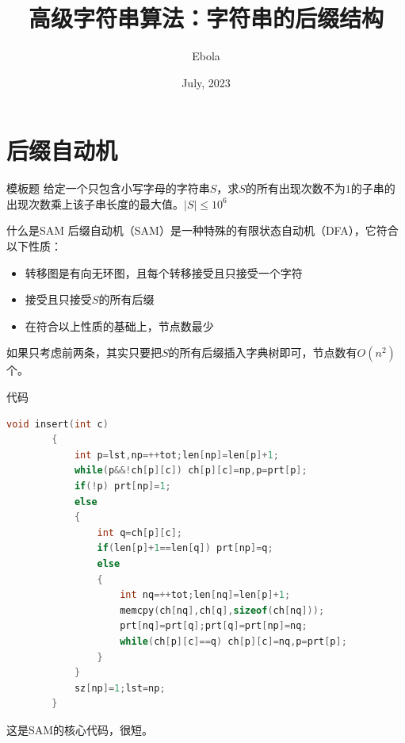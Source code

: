 \documentclass{beamer}
\author{Ebola}
\title{高级字符串算法：字符串的后缀结构}
\institute{
    Institute of Mathematics, \\
    Zhejiang University.
}
\date{July, 2023}
\begin{document}
\begin{frame}
    \titlepage
\end{frame}

\begin{frame}
    \tableofcontents[sectionstyle=show,subsectionstyle=show/shaded/hide,subsubsectionstyle=show/shaded/hide]
\end{frame}

\section{后缀自动机}

\begin{frame}{模板题}
    \small
    给定一个只包含小写字母的字符串$S$，求$S$的所有出现次数不为$1$的子串的出现次数乘上该子串长度的最大值。$|S|\leq 10^6$
\end{frame}

\begin{frame}{什么是SAM}
    \small
    后缀自动机（SAM）是一种特殊的有限状态自动机（DFA），它符合以下性质：

    \begin{itemize}
        \item 转移图是有向无环图，且每个转移接受且只接受一个字符
        \item 接受且只接受$S$的所有后缀
        \item 在符合以上性质的基础上，节点数最少
    \end{itemize}
    
    如果只考虑前两条，其实只要把$S$的所有后缀插入字典树即可，节点数有$O(n^2)$个。
\end{frame}

\begin{frame}[fragile]{代码}
    \begin{minipage}{\linewidth}
    \begin{lstlisting}[language=c++]
        void insert(int c)
        {
            int p=lst,np=++tot;len[np]=len[p]+1;
            while(p&&!ch[p][c]) ch[p][c]=np,p=prt[p];
            if(!p) prt[np]=1;
            else
            {
                int q=ch[p][c];
                if(len[p]+1==len[q]) prt[np]=q;
                else
                {
                    int nq=++tot;len[nq]=len[p]+1;
                    memcpy(ch[nq],ch[q],sizeof(ch[nq]));
                    prt[nq]=prt[q];prt[q]=prt[np]=nq;
                    while(ch[p][c]==q) ch[p][c]=nq,p=prt[p];
                }
            }
            sz[np]=1;lst=np;
        }
    \end{lstlisting}
    \end{minipage}

    这是SAM的核心代码，很短。
\end{frame}
\end{document}
